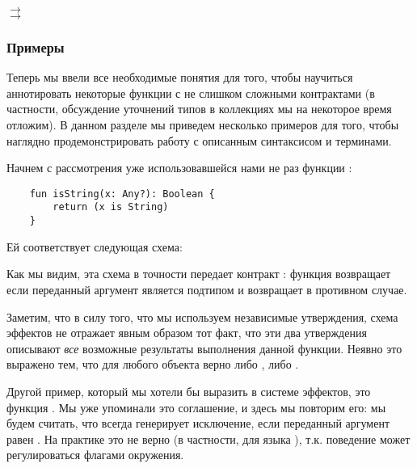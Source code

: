 \bigskip

{
     $\rightarrow$  \\
       $\rightarrow$ 
}
{}



\subsubsection{Примеры}

Теперь мы ввели все необходимые понятия для того, чтобы научиться аннотировать некоторые функции с не слишком сложными контрактами (в частности, обсуждение уточнений типов в коллекциях мы на некоторое время отложим). В данном разделе мы приведем несколько примеров для того, чтобы наглядно продемонстрировать работу с описанным синтаксисом и терминами.

Начнем с рассмотрения уже использовавшейся нами не раз функции :

\begin{verbatim}
    fun isString(x: Any?): Boolean {
        return (x is String)
    }
\end{verbatim}

Ей соответствует следующая схема:

{}

Как мы видим, эта схема в точности передает контракт : функция возвращает  если переданный аргумент является подтипом  и возвращает  в противном случае. 

Заметим, что в силу того, что мы используем независимые утверждения, схема эффектов не отражает явным образом тот факт, что эти два утверждения описывают \emph{все} возможные результаты выполнения данной функции. Неявно это выражено тем, что для любого объекта  верно либо , либо . 


\bigskip


Другой пример, который мы хотели бы выразить в системе эффектов, это функция . Мы уже упоминали это соглашение, и здесь мы повторим его: мы будем считать, что  всегда генерирует исключение, если переданный аргумент равен . На практике это не верно (в частности, для языка ), т.к. поведение  может регулироваться флагами окружения. 

